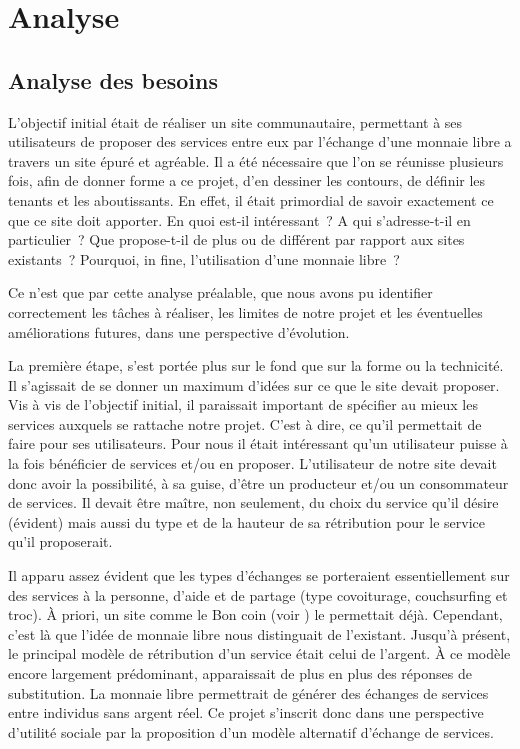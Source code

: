 \chapter{Analyse}

\section{Analyse des besoins}

L’objectif initial était de réaliser un site communautaire, permettant à ses utilisateurs de proposer des services entre eux par l’échange d'une monnaie libre a travers un site épuré et agréable. 
Il a été nécessaire que l’on se réunisse plusieurs fois, afin de donner forme a ce projet, d’en dessiner les contours, de définir les tenants et les aboutissants. 
En effet, il était primordial de savoir exactement ce que ce site doit apporter. En quoi est-il intéressant~? A qui s’adresse-t-il en particulier~? Que propose-t-il de plus ou de différent par rapport aux sites existants~? Pourquoi, in fine, l’utilisation d’une monnaie libre~? 

Ce n’est que par cette analyse préalable, que nous avons pu identifier correctement les tâches à réaliser, les limites de notre projet et les éventuelles améliorations futures, dans une perspective d’évolution.

La première étape, s’est portée plus sur le fond que sur la forme ou la technicité. Il s’agissait de se donner un maximum d’idées sur ce que le site devait proposer. 
Vis à vis de l’objectif initial, il paraissait important de spécifier au mieux les services auxquels se rattache notre projet. C’est à dire, ce qu’il permettait de faire pour ses utilisateurs. Pour nous il était intéressant qu’un utilisateur puisse à la fois bénéficier de services et/ou en proposer. L’utilisateur de notre site devait donc avoir la possibilité, à sa guise, d’être un producteur et/ou un consommateur de services. Il devait être maître, non seulement, du choix du service qu’il désire (évident) mais aussi du type et de la hauteur de sa rétribution pour le service qu’il proposerait. 

Il apparu assez évident que les types d’échanges se porteraient essentiellement sur des services à la personne, d’aide et de partage (type covoiturage, couchsurfing et troc). 
À priori, un site comme le Bon coin (voir \cite{bc}) le permettait déjà. Cependant, c’est là que l’idée de monnaie libre nous distinguait de l’existant. Jusqu’à présent, le principal modèle de rétribution d’un service était celui de l’argent. À ce modèle encore largement prédominant, apparaissait de plus en plus des réponses de substitution. La monnaie libre permettrait de générer des échanges de services entre individus sans argent réel. Ce projet s’inscrit donc dans une perspective d’utilité sociale par la proposition d’un modèle alternatif d’échange de services. 

